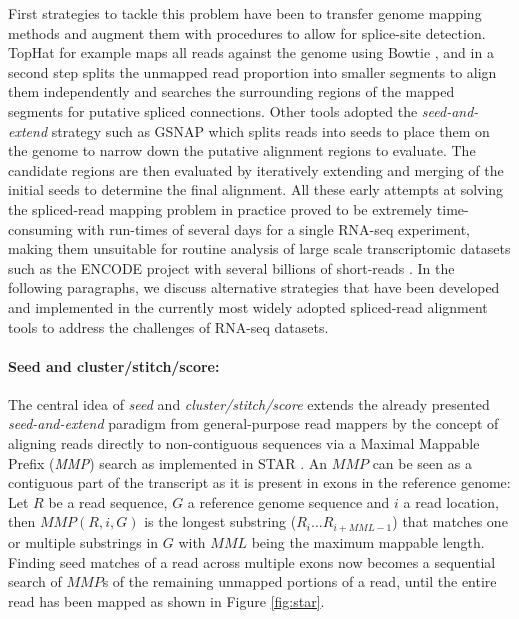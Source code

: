 First strategies to tackle this problem have been to transfer genome mapping methods and augment them with procedures to allow for splice-site detection. TopHat \citep{Trapnell2009} for example maps all reads against the genome using Bowtie \citep{Langmead}, and in a second step splits the unmapped read proportion into smaller segments to align them independently and searches the surrounding regions of the mapped segments for putative spliced connections. Other tools adopted the \textit{seed-and-extend} strategy such as GSNAP \citep{Wu2010} which splits reads into seeds to place them on the genome to narrow down the putative alignment regions to evaluate. The candidate regions are then evaluated by iteratively extending and merging of the initial seeds to determine the final alignment. All these early attempts at solving the spliced-read mapping problem in practice proved to be extremely time-consuming with run-times of several days for a single RNA-seq experiment, making them unsuitable for routine analysis of large scale transcriptomic datasets such as the ENCODE project \citep{Djebali2012} with several billions of short-reads \citep{Dobin2013}. In the following paragraphs, we discuss alternative strategies that have been developed and implemented in the currently most widely adopted spliced-read alignment tools to address the challenges of RNA-seq datasets.

\paragraph{Seed and cluster/stitch/score:} The central idea of \textit{seed} and \textit{cluster/stitch/score} extends the already presented \textit{seed-and-extend} paradigm from general-purpose read mappers by the concept of aligning reads directly to non-contiguous sequences via a Maximal Mappable Prefix (\textit{MMP}) search as implemented in STAR \citep{Dobin2013}. An $MMP$ can be seen as a contiguous part of the transcript as it is present in exons in the reference genome: Let $R$ be a read sequence, $G$ a reference genome sequence and $i$ a read location, then $MMP(R,i,G)$ is the longest substring ($R_i ... R_{i+MML-1}$) that matches one or multiple substrings in $G$ with $MML$ being the maximum mappable length. Finding seed matches of a read across multiple exons now becomes a sequential search of $MMP$s of the remaining unmapped portions of a read, until the entire read has been mapped as shown in Figure \ref{fig:star}.

